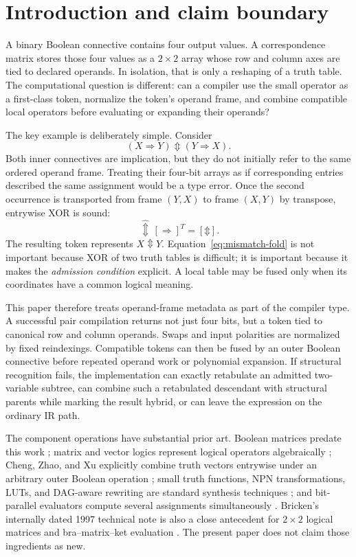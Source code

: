 \documentclass[10pt]{article}
\newcommand{\bxor}{\mathbin{\Updownarrow}}
\newcommand{\ptop}[1]{\widehat{#1}}
\theoremstyle{plain}
\theoremstyle{definition}
\theoremstyle{remark}
\begin{document}
\section{Introduction and claim boundary}

A binary Boolean connective contains four output values. A correspondence matrix stores those four values as a $2\times2$ array whose row and column axes are tied to declared operands. In isolation, that is only a reshaping of a truth table. The computational question is different: can a compiler use the small operator as a first-class token, normalize the token's operand frame, and combine compatible local operators before evaluating or expanding their operands?

The key example is deliberately simple. Consider
\begin{equation}
 (X\Rightarrow Y)\bxor(Y\Rightarrow X).
 \label{eq:mismatch-expression}
\end{equation}
Both inner connectives are implication, but they do not initially refer to the same ordered operand frame. Treating their four-bit arrays as if corresponding entries described the same assignment would be a type error. Once the second occurrence is transported from frame $(Y,X)$ to frame $(X,Y)$ by transpose, entrywise XOR is sound:
\begin{equation}
 [\Rightarrow]\,\ptop{\bxor}\,[\Rightarrow]^T=[\bxor].
 \label{eq:mismatch-fold}
\end{equation}
The resulting token represents $X\bxor Y$. Equation~\eqref{eq:mismatch-fold} is not important because XOR of two truth tables is difficult; it is important because it makes the \emph{admission condition} explicit. A local table may be fused only when its coordinates have a common logical meaning.

This paper therefore treats operand-frame metadata as part of the compiler type. A successful pair compilation returns not just four bits, but a token tied to canonical row and column operands. Swaps and input polarities are normalized by fixed reindexings. Compatible tokens can then be fused by an outer Boolean connective before repeated operand work or polynomial expansion. If structural recognition fails, the implementation can exactly retabulate an admitted two-variable subtree, can combine such a retabulated descendant with structural parents while marking the result hybrid, or can leave the expression on the ordinary IR path.

The component operations have substantial prior art. Boolean matrices predate this work \cite{Edwards1972}; matrix and vector logics represent logical operators algebraically \cite{Stern1988,Mizraji1992,Mizraji2008}; Cheng, Zhao, and Xu explicitly combine truth vectors entrywise under an arbitrary outer Boolean operation \cite{Cheng2011}; small truth functions, NPN transformations, LUTs, and DAG-aware rewriting are standard synthesis techniques \cite{Mishchenko2006,Zhou2019,Testa2019}; and bit-parallel evaluators compute several assignments simultaneously \cite{Lee2022}. Bricken's internally dated 1997 technical note is also a close antecedent for $2\times2$ logical matrices and bra--matrix--ket evaluation \cite{Bricken1997}. The present paper does not claim those ingredients as new.
\end{document}
